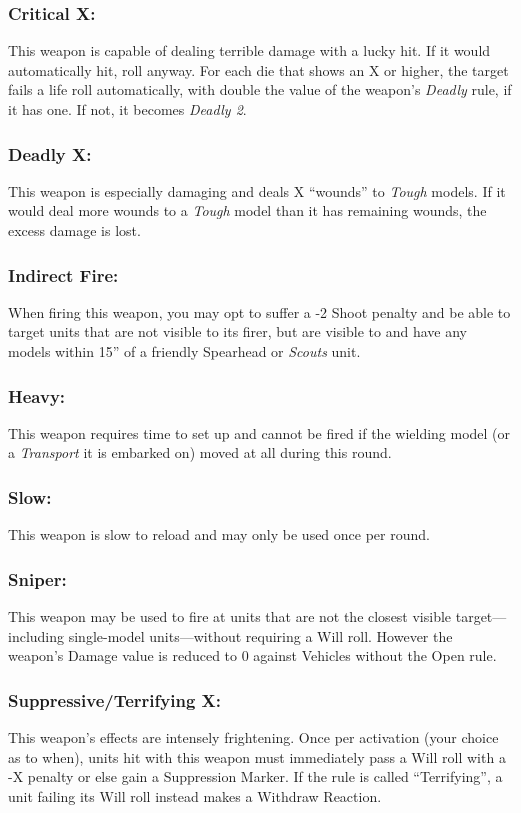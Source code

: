 \begin{multicols}{2}
\subsubsection*{Critical X:} This weapon is capable of dealing terrible damage with a lucky hit. If it would automatically hit, roll anyway. For each die that shows an X or higher, the target fails a life roll automatically, with double the value of the weapon's \textit{Deadly} rule, if it has one. If not, it becomes \textit{Deadly 2}.

\subsubsection*{Deadly X:} This weapon is especially damaging and deals X ``wounds'' to \textit{Tough} models. If it would deal more wounds to a \textit{Tough} model than it has remaining wounds, the excess damage is lost.

\subsubsection*{Indirect Fire:} When firing this weapon, you may opt to suffer a -2 Shoot penalty and be able to target units that are not visible to its firer, but are visible to and have any models within 15'' of a friendly Spearhead or \textit{Scouts} unit.

\subsubsection*{Heavy:} This weapon requires time to set up and cannot be fired if the wielding model (or a \textit{Transport} it is embarked on) moved at all during this round.

\subsubsection*{Slow:} This weapon is slow to reload and may only be used once per round.

\subsubsection*{Sniper:} This weapon may be used to fire at units that are not the closest visible target—including single-model units—without requiring a Will roll. However the weapon's Damage value is reduced to 0 against Vehicles without the Open rule.

\subsubsection*{Suppressive/Terrifying X:} This weapon's effects are intensely frightening. Once per activation (your choice as to when), units hit with this weapon must immediately pass a Will roll with a -X penalty or else gain a Suppression Marker. If the rule is called ``Terrifying'', a unit failing its Will roll instead makes a Withdraw Reaction.


\end{multicols}
